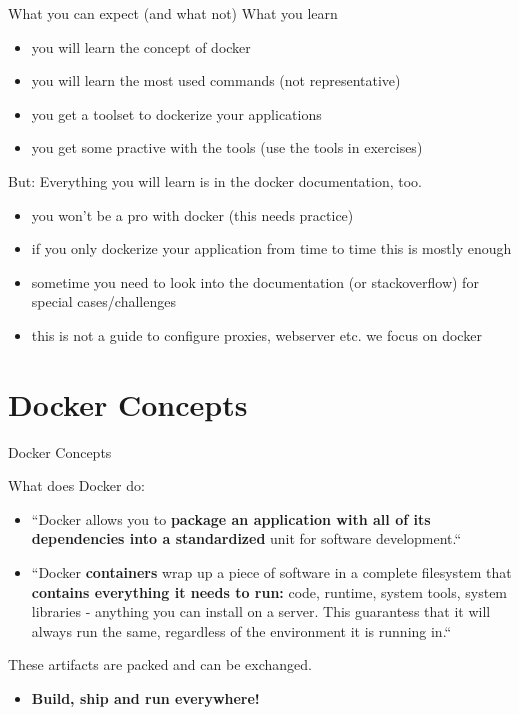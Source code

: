 \documentclass[10pt,aspectratio=\ratio,
compress
]{beamer}
\newcommand\meta{./meta}
\begin{document}
\begin{frame}{What you can expect (and what not)}
What you learn
\begin{itemize}
	\item you will learn the concept of docker
	\item you will learn the most used commands (not representative)
	\item you get a toolset to dockerize your applications
	\item you get some practive with the tools (use the tools in exercises)
\end{itemize}
But: Everything you will learn  is in the docker documentation, too.
\begin{itemize}
	\item you won't be a pro with docker (this needs practice)
	\item if you only dockerize your application from time to time this is mostly enough
	\item sometime you need to look into the documentation (or stackoverflow) for special cases/challenges
	\item this is not a guide to configure proxies, webserver etc. we focus on docker
\end{itemize}

\end{frame}
\section{Docker Concepts}
\begin{frame}{Docker Concepts}

What does Docker do:
\begin{itemize}
	\item ``Docker allows you to \textbf{package an application with all of its dependencies into a standardized} unit for software development.``
	\item ``Docker \textbf{containers} wrap up a piece of software in a complete filesystem that \textbf{contains everything it needs to run:} code, runtime, system tools, system libraries - anything you can install on a server. This guarantess that it will always run the same, regardless of the environment it is running in.``
\end{itemize}
These artifacts are packed and can be exchanged.
\begin{itemize}
\item \textbf{Build, ship and run everywhere!}
\end{itemize}
\end{frame}
\end{document}
